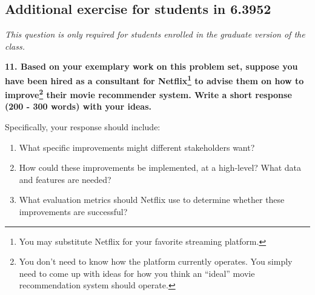 \documentclass{article}
\begin{document}
\subsection*{Additional exercise for students in 6.3952}

\textit{This question is only required for students enrolled in the graduate version of the class.}

\textbf{11. Based on your exemplary work on this problem set, suppose you have been hired as a consultant for Netflix\footnote{You may substitute Netflix for your favorite streaming platform.} to advise them on how to improve\footnote{You don't need to know how the platform currently operates. You simply need to come up with ideas for how you think an ``ideal'' movie recommendation system should operate.} their movie recommender system. Write a short response (200 - 300 words) with your ideas.}

Specifically, your response should include: 
\begin{enumerate}
    \item What specific improvements might different stakeholders want? 
    \item How could these improvements be implemented, at a high-level? What data and features are needed?    
    \item What evaluation metrics should Netflix use to determine whether these improvements are successful?
\end{enumerate}
\end{document}
